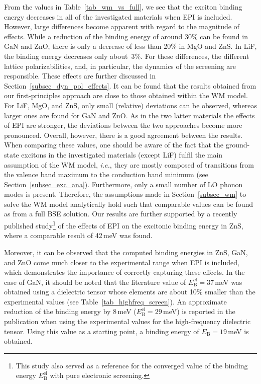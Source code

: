 %
From the values in Table~\ref{tab_wm_vs_full}, we see that the exciton binding energy decreases in all of the investigated materials when EPI is included. However, large differences become apparent with regard to the  magnitude of effects. While a reduction of the binding energy  of around 30\% can be found in GaN and ZnO, there is only a decrease of less than 20\% in MgO and ZnS. In LiF, the binding energy decreases only about~3\%. For these differences, the different lattice polarizabilities, and, in particular,  the dynamics of the screening are responsible. These effects are further discussed in Section~\ref{subsec_dyn_pol_effects}. It can be found that the results obtained from our first-principles approach are close to those obtained within the WM model. For LiF, MgO, and ZnS, only small (relative) deviations can be observed, whereas larger ones are found for GaN and ZnO. As in the two latter materials the effects of EPI are stronger, the deviations between the two approaches become more pronounced. Overall, however, there is a good agreement between the results. When comparing these values, one should be aware of the fact that the ground-state excitons in the investigated materials (except LiF) fulfil the main assumption of the WM model, \textit{i.e.}, they are mostly composed of transitions from the valence band maximum to the conduction band minimum (see Section~\ref{subsec_exc_ana}). Furthermore, only a small number of LO phonon modes is present. Therefore, the assumptions made in Section~\ref{subsec_wm} to solve the WM model  analytically hold such that comparable values can be found as from a  full BSE solution. Our results are further supported by a recently published study\footnote[2]{This study also served as a reference for the converged value of the binding energy $E^\text{el}_\text{B}$ with pure electronic screening.} of the effects of EPI on the excitonic binding energy in ZnS, where a comparable result of 42\,meV was found\cite{zns_bse}.\par 

Moreover, it can be observed that the computed binding energies in ZnS, GaN, and ZnO come much closer to the experimental range when EPI is included, which demonstrates the importance of correctly capturing these effects. In the case of GaN, it should be noted that the literature value of $E^\text{el}_\text{B}=37$\,meV was obtained using a dielectric tensor whose elements are about 10\% smaller than the experimental values (see Table~\ref{tab_highfreq_screen}). An approximate reduction of the binding energy by 8\,meV  ($E^\text{el}_\text{B}=29$\,meV) is reported in the publication when using the experimental values for the high-frequency dielectric tensor\cite{draxl_gan}. Using this value as a starting point, a binding energy of $E_\text{B}^{\phantom{l}}=19$\,meV is obtained. 


